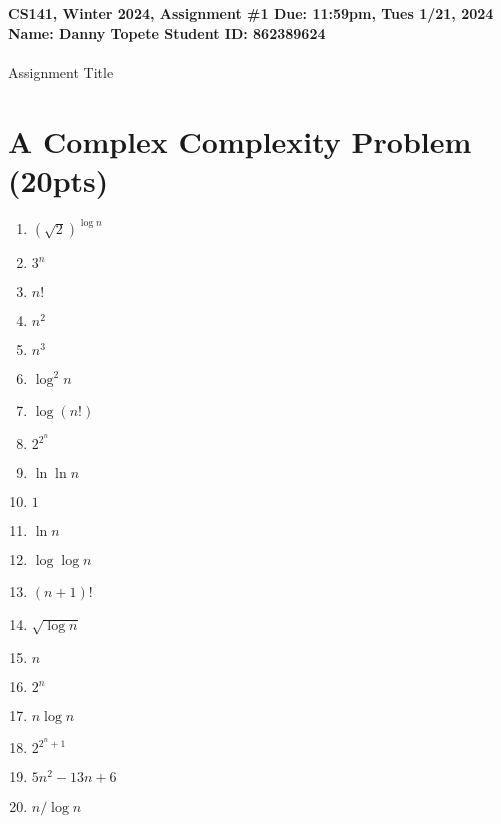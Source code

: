 \documentclass{article}[12pt]
\newcommand\encircle[1]{\raisebox{.5pt}{\textcircled{\raisebox{-.9pt} {\footnotesize #1}}} }
\newcommand{\deadline}{11:59pm, Tues 1/21, 2024}
\newcommand{\assigntitle}[1]{{
  \noindent \large \bf
  CS141, Winter 2024,
  Assignment \##1 \hfill Due: {\deadline}\\
  Name: Danny Topete %
  \hspace{2.5in}
  Student ID: 862389624 %
  \\
  [-.05in]
  \mbox{}\hrulefill \mbox{}\\}}
\begin{document}
\assigntitle{1}{Assignment Title}
\date{\today}

\section{A Complex Complexity Problem (20pts)}

\begin{center}
\begin{multicols}{4}
\begin{enumerate}[label=\encircle{\arabic*}]
  \item $(\sqrt{2})^{\log n}$
  \item $3^n$
  \item $n!$
  \item $n^2$
  \item $n^3$
  \item $\log^2n$
  \item $\log(n!)$
  \item $2^{2^n}$
  \item $\ln\ln n$
  \item $1$
  \item $\ln n$
  \item $\log \log n$
  \item $(n+1)!$
  \item $\sqrt{\log n}$
  \item $n$
  \item $2^n$
  \item $n\log n$
  \item $2^{2^n+1}$
  \item $5n^2-13n+6$
  \item $n/\log n$
\end{enumerate}
\end{multicols}
\end{center}
\end{document}
